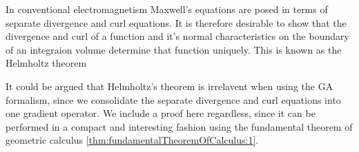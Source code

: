 %
%
In conventional electromagnetism Maxwell's equations are posed in terms of separate divergence and curl equations.  It is therefore desirable to show that the divergence and curl of a function and it's normal characteristics on the boundary of an integraion volume determine that function uniquely.  This is known as the Helmholtz theorem

It could be argued that Helmholtz's theorem is irrelavent when using the GA formalism, since we consolidate the separate divergence and curl equations into one gradient operator.
We include a proof here regardless, since it can be performed in a compact and interesting fashion using
the fundamental theorem of geometric calculus \cref{thm:fundamentalTheoremOfCalculus:1}.


